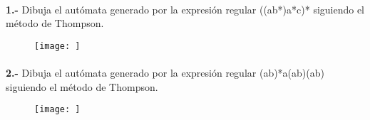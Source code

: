 \documentclass[11pt,a4paper]{report}
\begin{document}
\paragraph{}

\paragraph{}
\textbf{1.-} Dibuja el autómata generado por la expresión regular ((a\textbar b*)a*c)* siguiendo el método de Thompson.
\begin{figure}[ht!]
\centering
\texttt{[image: ]}
\end{figure}\paragraph{}
\textbf{2.-} Dibuja el autómata generado por la expresión regular (a\textbar b)*a(a\textbar b)(a\textbar b) siguiendo el método de Thompson.
\begin{figure}[ht!]
\centering
\texttt{[image: ]}
\end{figure}
\end{document}
